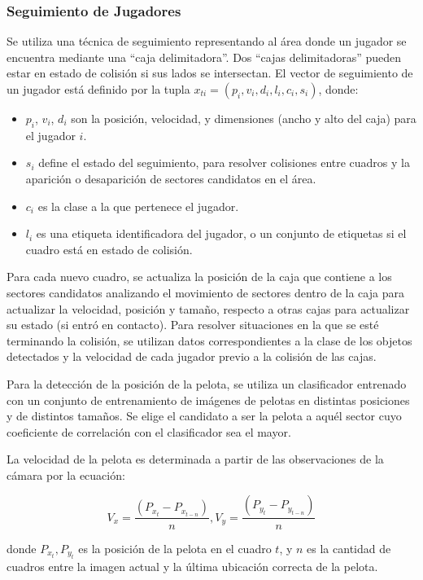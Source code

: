\subsubsection{Seguimiento de Jugadores}

Se utiliza una técnica de seguimiento representando al área donde un jugador se
encuentra mediante una ``caja delimitadora''.
Dos ``cajas delimitadoras'' pueden estar en estado de colisión si sus lados se
intersectan. El vector de seguimiento de un jugador está definido por la tupla
$x_{ti} = (p_i, v_i, d_i, l_i, c_i, s_i)$, donde:

\begin{itemize}
  \item $p_i$, $v_i$, $d_i$ son la posición, velocidad, y dimensiones
    (ancho y alto del caja) para el jugador $i$.
  \item $s_i$ define el estado del seguimiento, para resolver
    colisiones entre cuadros y la aparición o desaparición de
    sectores candidatos en el área.
  \item $c_i$ es la clase a la que pertenece el jugador.
  \item $l_i$ es una etiqueta identificadora del jugador, o un conjunto de
etiquetas si el cuadro está en estado de colisión.
\end{itemize}

Para cada nuevo cuadro, se actualiza la posición de la caja que contiene a
los sectores candidatos analizando el movimiento de sectores dentro de la
caja para actualizar la velocidad, posición y tamaño,
respecto a otras cajas para actualizar su estado (si entró en contacto).
Para resolver situaciones en la que se esté terminando la colisión, se utilizan
datos correspondientes a la clase de los objetos detectados y la velocidad de
cada jugador previo a la colisión de las cajas.

Para la detección de la posición de la pelota, se utiliza un clasificador
entrenado con un conjunto de entrenamiento de imágenes de pelotas en distintas
posiciones y de distintos tamaños. Se elige el candidato a ser la pelota a
aquél sector cuyo coeficiente de correlación con el clasificador sea el mayor.

La velocidad de la pelota es determinada a partir de las observaciones de la
cámara por la ecuación:

\[
  V_x = \frac{(P_{x_t} - P_{x_{t-n}})}{n}, V_y = \frac{(P_{y_t} - P_{y_{t-n}})}{n}
\]

donde $P_{x_t}, P_{y_t}$ es la posición de la pelota en el cuadro $t$, y $n$ es
la cantidad de cuadros entre la imagen actual y la última ubicación correcta de
la pelota.

